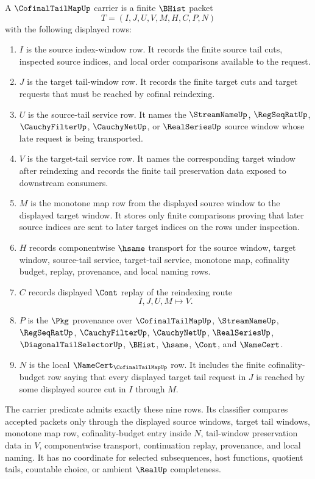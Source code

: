 \begin{definition}
\label{def:cofinal-tail-map-carrier}
A $\CofinalTailMapUp$ carrier is a finite $\BHist$ packet
$$
T=(I,J,U,V,M,H,C,P,N)
$$
with the following displayed rows:
\begin{enumerate}
\item $I$ is the source index-window row. It records the finite source tail cuts, inspected source indices, and local order comparisons available to the request.
\item $J$ is the target tail-window row. It records the finite target cuts and target requests that must be reached by cofinal reindexing.
\item $U$ is the source-tail service row. It names the $\StreamNameUp$, $\RegSeqRatUp$, $\CauchyFilterUp$, $\CauchyNetUp$, or $\RealSeriesUp$ source window whose late request is being transported.
\item $V$ is the target-tail service row. It names the corresponding target window after reindexing and records the finite tail preservation data exposed to downstream consumers.
\item $M$ is the monotone map row from the displayed source window to the displayed target window. It stores only finite comparisons proving that later source indices are sent to later target indices on the rows under inspection.
\item $H$ records componentwise $\hsame$ transport for the source window, target window, source-tail service, target-tail service, monotone map, cofinality budget, replay, provenance, and local naming rows.
\item $C$ records displayed $\Cont$ replay of the reindexing route
$$
I,J,U,M \longmapsto V .
$$
\item $P$ is the $\Pkg$ provenance over $\CofinalTailMapUp$, $\StreamNameUp$, $\RegSeqRatUp$, $\CauchyFilterUp$, $\CauchyNetUp$, $\RealSeriesUp$, $\DiagonalTailSelectorUp$, $\BHist$, $\hsame$, $\Cont$, and $\NameCert$.
\item $N$ is the local $\NameCert_{\CofinalTailMapUp}$ row. It includes the finite cofinality-budget row saying that every displayed target tail request in $J$ is reached by some displayed source cut in $I$ through $M$.
\end{enumerate}
The carrier predicate admits exactly these nine rows. Its classifier compares accepted packets only through the displayed source windows, target tail windows, monotone map row, cofinality-budget entry inside $N$, tail-window preservation data in $V$, componentwise transport, continuation replay, provenance, and local naming. It has no coordinate for selected subsequences, host functions, quotient tails, countable choice, or ambient $\RealUp$ completeness.
\end{definition}

